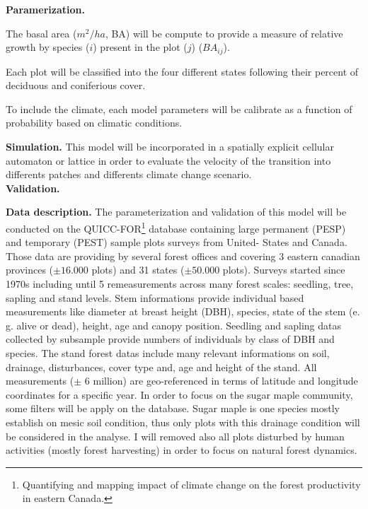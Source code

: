 \textbf{Paramerization.} 

The basal area ($m^2/ha$, BA) will be compute to provide a measure of relative
growth by species ($i$) present in the plot ($j$) ($BA_{ij}$).

Each plot will be classified into the four different states following their percent of deciduous and coniferious cover.  

To include the climate, each model parameters will be calibrate as a
function of probability based on climatic conditions. %

\textbf{Simulation.} This model will be incorporated in a spatially explicit cellular automaton or lattice in
order to evaluate the velocity of the transition into differents patches and differents
climate change scenario.\\


\textbf{Validation.} 


\textbf{Data description.}  The parameterization and validation of this model
will be conducted on the QUICC-FOR\footnote{Quantifying and mapping impact of
climate change on the forest productivity in eastern Canada.} database
containing large permanent (PESP) and temporary (PEST) sample plots surveys
from United- States and Canada. Those data are providing by several forest
offices and covering 3 eastern canadian provinces ($\pm16.000$ plots) and 31
states ($\pm50.000$ plots). Surveys started since 1970s including until 5
remeasurements across many forest scales: seedling, tree, sapling and stand
levels. Stem informations provide individual based measurements like diameter
at breast height  (DBH), species, state of the stem (e. g. alive or dead),
height, age and canopy position. Seedling and sapling datas collected by
subsample provide numbers of individuals  by class of DBH and species. The
stand forest datas include many relevant informations on soil, drainage,
disturbances, cover type and, age and height of the stand. All measurements
($\pm$ 6 million) are geo-referenced in terms of latitude and longitude
coordinates for a specific year. In order to focus on the sugar maple
community, some filters will be apply on the database. Sugar maple is one
species mostly establish on mesic soil condition, thus only plots with this
drainage condition will be considered in the analyse. I will removed also all
plots disturbed by human activities (mostly forest harvesting) in order to
focus on natural forest dynamics.

